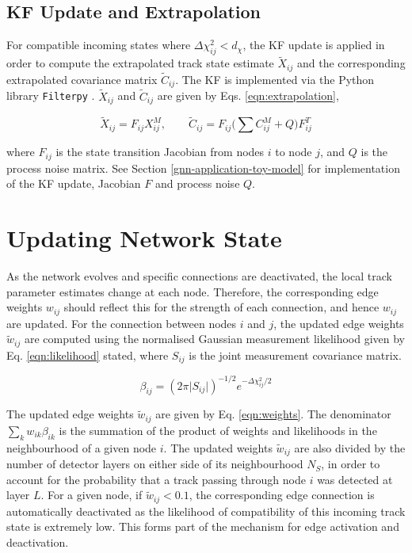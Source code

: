 \subsection{KF Update and Extrapolation}
\label{chapter-5-kf-extrapolation}

For compatible incoming states where $\Delta \chi^{2}_{ij} < d_{\chi}$, the KF update is applied in order to compute the extrapolated track state estimate $\tilde{X}_{ij}$ and the corresponding extrapolated covariance matrix $\widetilde{C}_{ij}$. The KF is implemented via the Python library \texttt{Filterpy} \cite{filterpy}. $\tilde{X}_{ij}$ and $\widetilde{C}_{ij}$ are given by Eqs. \eqref{eqn:extrapolation},

\begin{equation}
\tilde{X}_{ij} = F_{ij} X_{ij}^{M}, \qquad \tilde{C}_{ij} = F_{ij} \biggl( \sum C_{ij}^{M} + Q \biggl) F^{T}_{ij}
\label{eqn:extrapolation}
\end{equation}

where $F_{ij}$ is the state transition Jacobian from nodes $i$ to node $j$, and $Q$ is the process noise matrix. See Section \ref{gnn-application-toy-model} for implementation of the KF update, Jacobian $F$ and process noise $Q$. 






\section{Updating Network State}
\label{gnn-updating-network-state}

As the network evolves and specific connections are deactivated, the local track parameter estimates change at each node. Therefore, the corresponding edge weights $w_{ij}$ should reflect this for the strength of each connection, and hence $w_{ij}$ are updated. For the connection between nodes $i$ and $j$, the updated edge weights $\widetilde{w}_{ij}$ are computed using the normalised Gaussian measurement likelihood given by Eq. \eqref{eqn:likelihood} stated, where $S_{ij}$ is the joint measurement covariance matrix.

\begin{equation}
\beta_{ij} = (2 \pi \lvert S_{ij} \rvert )^{-1/2}  e^{-\Delta \chi^{2}_{ij} / 2}
\label{eqn:likelihood}
\end{equation}


The updated edge weights $\widetilde{w}_{ij}$ are given by Eq. \eqref{eqn:weights}. The denominator $\sum_{k}w_{ik}\beta_{ik}$ is the summation of the product of weights and likelihoods in the neighbourhood of a given node $i$. The updated weights $\widetilde{w}_{ij}$ are also divided by the number of detector layers on either side of its neighbourhood $N_S$, in order to account for the probability that a track passing through node $i$ was detected at layer $L$. For a given node, if $\widetilde{w}_{ij} < 0.1$, the corresponding edge connection is automatically deactivated as the likelihood of compatibility of this incoming track state is extremely low. This forms part of the mechanism for edge activation and deactivation.

